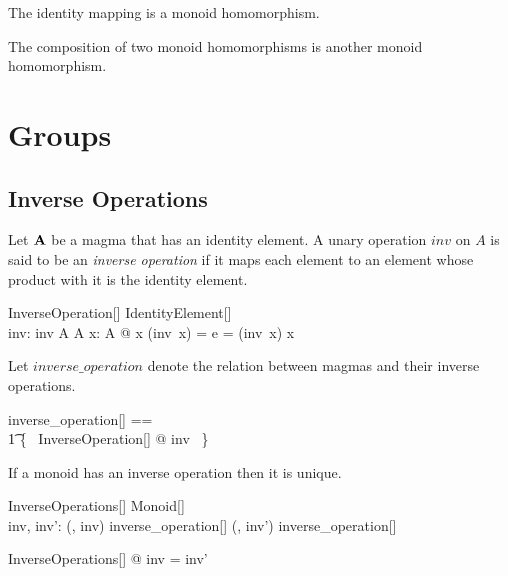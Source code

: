\documentclass{amsart}
\begin{document}
\begin{remark}
The identity mapping is a monoid homomorphism.
\end{remark}

\begin{remark}
The composition of two monoid homomorphisms is another monoid homomorphism.
\end{remark}

\section{Groups}

\subsection{Inverse Operations}

Let $\mathbf{A}$ be a magma that has an identity element.
A unary operation $inv$ on $A$ is said to be an \textit{inverse operation} if it maps each element
to an element whose product with it is the identity element.

\begin{schema}{InverseOperation}[\genT]
	IdentityElement[\genT] \\
	inv: \genT \pfun \genT
\where
	inv \in A \fun A
\also
	\forall x: A @ x \opG (inv~x) = e = (inv~x)  \opG x
\end{schema}

Let $inverse\_operation$ denote the relation between magmas and their inverse operations.
\begin{zed}
	inverse\_operation[\genT] == \\
	\t1	\{~ InverseOperation[\genT] @ \strucA \mapsto inv ~\}
\end{zed}

\begin{remark}
If a monoid has an inverse operation then it is unique.
\end{remark}

\begin{schema}{InverseOperations}[\genT]
	Monoid[\genT] \\
	inv, inv': \genT \pfun \genT
\where
	(\strucA, inv) \in inverse\_operation[\genT]
\also
	(\strucA, inv') \in inverse\_operation[\genT]
\end{schema}

\begin{zed}
	\forall InverseOperations[\setT] @ inv = inv'
\end{zed}
\end{document}
